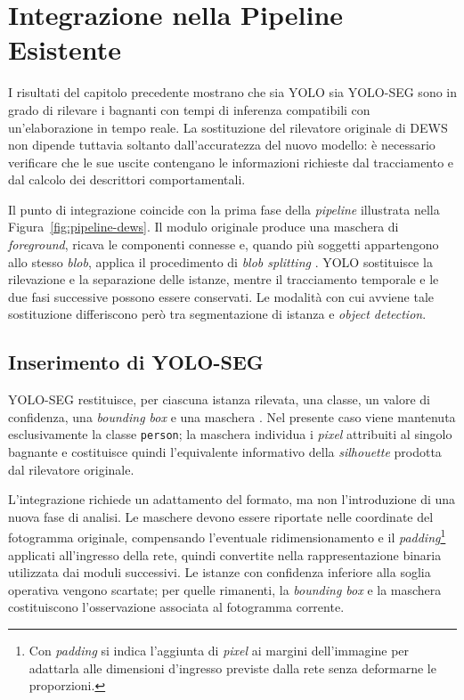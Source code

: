 \chapter{Integrazione nella Pipeline Esistente}

I risultati del capitolo precedente mostrano che sia YOLO sia YOLO-SEG sono in grado di rilevare i bagnanti con tempi di inferenza compatibili con un'elaborazione in tempo reale. La sostituzione del rilevatore originale di DEWS non dipende tuttavia soltanto dall'accuratezza del nuovo modello: è necessario verificare che le sue uscite contengano le informazioni richieste dal tracciamento e dal calcolo dei descrittori comportamentali.

Il punto di integrazione coincide con la prima fase della \textit{pipeline} illustrata nella Figura~\ref{fig:pipeline-dews}. Il modulo originale produce una maschera di \textit{foreground}, ricava le componenti connesse e, quando più soggetti appartengono allo stesso \textit{blob}, applica il procedimento di \textit{blob splitting} \cite{Eng2008DEWS}. YOLO sostituisce la rilevazione e la separazione delle istanze, mentre il tracciamento temporale e le due fasi successive possono essere conservati. Le modalità con cui avviene tale sostituzione differiscono però tra segmentazione di istanza e \textit{object detection}.

\section{Inserimento di YOLO-SEG}

YOLO-SEG restituisce, per ciascuna istanza rilevata, una classe, un valore di confidenza, una \textit{bounding box} e una maschera \cite{Jocher2026YOLO26}. Nel presente caso viene mantenuta esclusivamente la classe \texttt{person}; la maschera individua i \textit{pixel} attribuiti al singolo bagnante e costituisce quindi l'equivalente informativo della \textit{silhouette} prodotta dal rilevatore originale.

L'integrazione richiede un adattamento del formato, ma non l'introduzione di una nuova fase di analisi. Le maschere devono essere riportate nelle coordinate del fotogramma originale, compensando l'eventuale ridimensionamento e il \textit{padding}\footnote{Con \textit{padding} si indica l'aggiunta di \textit{pixel} ai margini dell'immagine per adattarla alle dimensioni d'ingresso previste dalla rete senza deformarne le proporzioni.} applicati all'ingresso della rete, quindi convertite nella rappresentazione binaria utilizzata dai moduli successivi. Le istanze con confidenza inferiore alla soglia operativa vengono scartate; per quelle rimanenti, la \textit{bounding box} e la maschera costituiscono l'osservazione associata al fotogramma corrente.

